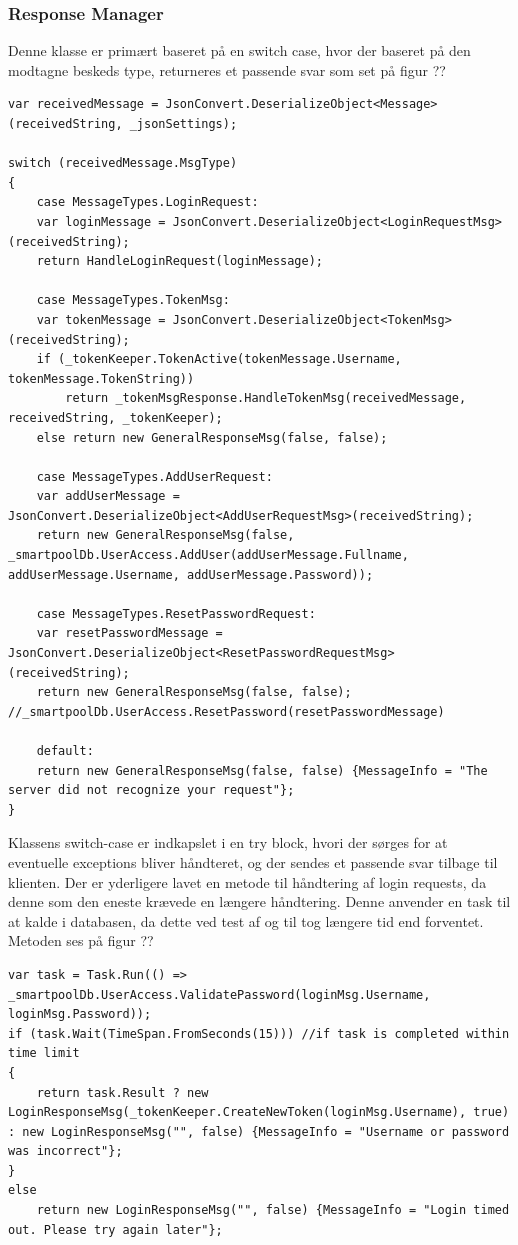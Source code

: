 \subsubsection{Response Manager}
Denne klasse er primært baseret på en switch case, hvor der baseret på den modtagne beskeds type, returneres et passende svar som set på figur ??
\begin{lstlisting}[caption=Server.ResponseManager, label=code:Server.ResponseManager]
var receivedMessage = JsonConvert.DeserializeObject<Message>(receivedString, _jsonSettings);

switch (receivedMessage.MsgType)
{
	case MessageTypes.LoginRequest:
	var loginMessage = JsonConvert.DeserializeObject<LoginRequestMsg>(receivedString);
	return HandleLoginRequest(loginMessage);
	
	case MessageTypes.TokenMsg:
	var tokenMessage = JsonConvert.DeserializeObject<TokenMsg>(receivedString);
	if (_tokenKeeper.TokenActive(tokenMessage.Username, tokenMessage.TokenString))
		return _tokenMsgResponse.HandleTokenMsg(receivedMessage, receivedString, _tokenKeeper);
	else return new GeneralResponseMsg(false, false);
	
	case MessageTypes.AddUserRequest:
	var addUserMessage = JsonConvert.DeserializeObject<AddUserRequestMsg>(receivedString);
	return new GeneralResponseMsg(false, _smartpoolDb.UserAccess.AddUser(addUserMessage.Fullname, addUserMessage.Username, addUserMessage.Password));
	
	case MessageTypes.ResetPasswordRequest:
	var resetPasswordMessage = JsonConvert.DeserializeObject<ResetPasswordRequestMsg>(receivedString);
	return new GeneralResponseMsg(false, false); //_smartpoolDb.UserAccess.ResetPassword(resetPasswordMessage)
	
	default:
	return new GeneralResponseMsg(false, false)	{MessageInfo = "The server did not recognize your request"};
}
\end{lstlisting}

Klassens switch-case er indkapslet i en try block, hvori der sørges for at eventuelle exceptions bliver håndteret, og der sendes et passende svar tilbage til klienten. Der er yderligere lavet en metode til håndtering af login requests, da denne som den eneste krævede en længere håndtering. Denne anvender en task til at kalde i databasen, da dette ved test af og til tog længere tid end forventet. Metoden ses på figur ??

\begin{lstlisting}[caption=Server.ResponseManager.HandleLoginRequest, label=code:Server.ResponseManager.HandleLoginRequest]
var task = Task.Run(() => _smartpoolDb.UserAccess.ValidatePassword(loginMsg.Username, loginMsg.Password));
if (task.Wait(TimeSpan.FromSeconds(15))) //if task is completed within time limit
{
	return task.Result ? new LoginResponseMsg(_tokenKeeper.CreateNewToken(loginMsg.Username), true) : new LoginResponseMsg("", false) {MessageInfo = "Username or password was incorrect"};
}
else
	return new LoginResponseMsg("", false) {MessageInfo = "Login timed out. Please try again later"};
\end{lstlisting}

